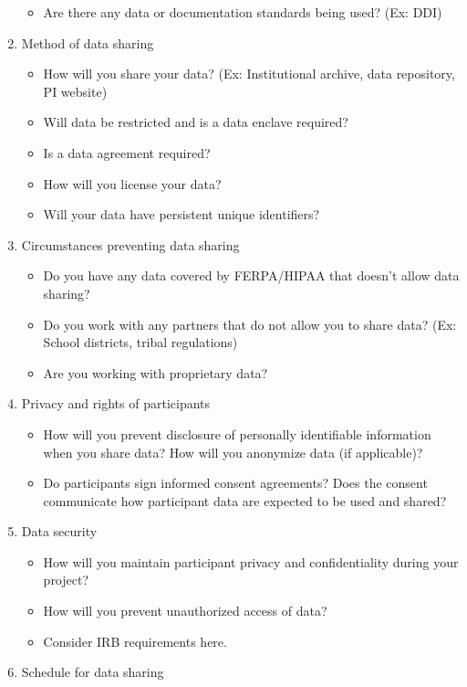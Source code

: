 \documentclass[
]{book}
\providecommand{\tightlist}{%
  \setlength{\itemsep}{0pt}\setlength{\parskip}{0pt}}
\begin{document}
\begin{enumerate}
  \begin{itemize}
  \tightlist
  \item
    Are there any data or documentation standards being used? (Ex: DDI)
  \end{itemize}
\item
  Method of data sharing

  \begin{itemize}
  \tightlist
  \item
    How will you share your data? (Ex: Institutional archive, data repository, PI website)
  \item
    Will data be restricted and is a data enclave required?
  \item
    Is a data agreement required?
  \item
    How will you license your data?
  \item
    Will your data have persistent unique identifiers?
  \end{itemize}
\item
  Circumstances preventing data sharing

  \begin{itemize}
  \tightlist
  \item
    Do you have any data covered by FERPA/HIPAA that doesn't allow data sharing?
  \item
    Do you work with any partners that do not allow you to share data? (Ex: School districts, tribal regulations)
  \item
    Are you working with proprietary data?
  \end{itemize}
\item
  Privacy and rights of participants

  \begin{itemize}
  \tightlist
  \item
    How will you prevent disclosure of personally identifiable information when you share data? How will you anonymize data (if applicable)?
  \item
    Do participants sign informed consent agreements? Does the consent communicate how participant data are expected to be used and shared?
  \end{itemize}
\item
  Data security

  \begin{itemize}
  \tightlist
  \item
    How will you maintain participant privacy and confidentiality during your project?
  \item
    How will you prevent unauthorized access of data?
  \item
    Consider IRB requirements here.
  \end{itemize}
\item
  Schedule for data sharing


\end{enumerate}
\end{document}
